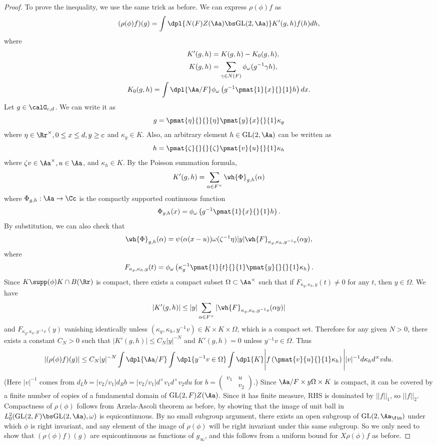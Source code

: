 \documentclass{article}
\newcommand{\GL}{\mathrm{GL}}
\newcommand{\smat}[4]{\left(\begin{smallmatrix} #1 & #2 \\ #3 & #4 \end{smallmatrix}\right)}
\begin{document}
\begin{proof}
To prove the inequality, we use the same trick as before. We can express $\rho(\phi)f$ as 
$$
(\rho(\phi)f)(g) = \int\dpl{N(F)Z(\Aa)\bs \GL(2, \Aa)} K'(g, h)f(h)dh, 
$$
where
\begin{align*}
K'(g, h) & = K(g, h) - K_{0}(g, h), \\
K(g, h) & = \sum_{\gamma \in N(F)} \phi_{\omega}(g^{-1}\gamma h), \\
K_{0}(g, h) = \int\dpl{\Aa/F} &\phi_{\omega} \left( g^{-1} \pmat{1}{x}{}{1} h\right)dx. 
\end{align*}
Let $g\in \calG_{c, d}$. We can write it as
$$
g = \pmat{\eta}{}{}{\eta} \pmat{y}{x}{}{1} \kappa_{g}
$$
where $\eta\in \Rr^{\times}, 0\leq x\leq d, y\geq c$ and $\kappa_{g} \in K$. 
Also, an arbitrary element $h\in \GL(2, \Aa)$ can be written as
$$
h = \pmat{\zeta}{}{}{\zeta}\pmat{v}{u}{}{1} \kappa_{h}
$$
where $\zeta v\in \Aa^{\times}, u\in \Aa$, and $\kappa_{h} \in K$. 
By the Poisson summation formula, 
$$
K'(g, h) = \sum_{\alpha\in F^{\times}} \wh{\Phi}_{g, h}(\alpha)
$$
where $\Phi_{g, h}:\Aa\to \Cc$ is the compactly supported continuous function 
$$
\Phi_{g, h}(x) =\phi_{\omega} \left( g^{-1} \pmat{1}{x}{}{1} h\right).
$$
By substitution, we can also check that
$$
\wh{\Phi}_{g, h}(\alpha) = \psi(\alpha(x-u))\omega(\zeta^{-1}\eta) |y|\wh{F}_{\kappa_{g}, \kappa_{h}, y^{-1}v}(\alpha y),
$$
where 
$$
F_{\kappa_{g}, \kappa_{h}, y}(t) = \phi_{\omega} \left( \kappa_{g}^{-1} \pmat{1}{t}{}{1} \pmat{y}{}{}{1} \kappa_{h}\right). 
$$
Since $K\supp(\phi)K \cap B(\Rr)$ is compact, there exists a compact subset $\Omega \subset \Aa^{\times}$ such that if $F_{\kappa_g, \kappa_h, y}(t) \neq 0$ for any $t$, then $y\in \Omega$. We have
$$
|K'(g, h)| \leq |y| \sum_{\alpha\in F^{\times}} |\wh{F}_{\kappa_g, \kappa_h, y^{-1}v}(\alpha y)| 
$$
and $F_{\kappa_g, \kappa_h, y^{-1}v}(y)$ vanishing identically unless $(\kappa_g, \kappa_h, y^{-1}v) \in K\times K\times \Omega$, which is a compact set. 
Therefore for any given $N>0$, there exists a constant $C_N > 0$ such that $|K'(g, h)| \leq C_N |y|^{-N}$ and $K'(g, h) = 0$ unless $y^{-1}v \in \Omega$. Thus
$$
|(\rho(\phi)f)(g)| \leq C_{N}|y|^{-N} \int\dpl{\Aa/F} \int\dpl{y^{-1}v\in \Omega}\int\dpl{K} \Bigg| f\left( \pmat{v}{u}{}{1} \kappa_{h}\right)\Bigg| |v|^{-1} d\kappa_{h}d^{\times}v du. 
$$
(Here $|v|^{-1}$ comes from $d_{L}b = |v_{2}/v_{1}| d_{R}b = |v_{2}/v_{1}|d^{\times}v_1 d^{\times}v_2 du$ for $b = \smat{v_1}{u}{}{v_2}$.) 
Since $\Aa/F \times y\Omega \times K$ is compact, it can be covered by a finite number of copies of a fundamental domain of $\GL(2, F)Z(\Aa)$. Since it has finite measure, RHS is dominated by $||f||_{1}$, so $||f||_{2}$. 
Compactness of $\rho(\phi)$ follows from Arzela-Ascoli theorem as before, by showing that the image of unit ball in $L^{2}_{0}(\GL(2, F) \bs \GL(2, \Aa), \omega)$ is equicontinuous. 
By no small subgroup argument, there exists an open subgroup of $\GL(2, \Aa_{\fin})$ under which $\phi$ is right invariant, and any element of the image of $\rho(\phi)$ will be right invariant under this same subgroup. So we only need to show that $(\rho(\phi)f)(g)$ are equicontinuous as functions of $g_{\infty}$, and this follows from a uniform bound for $X\rho(\phi)f$ as before. 
\end{proof}
\end{document}

